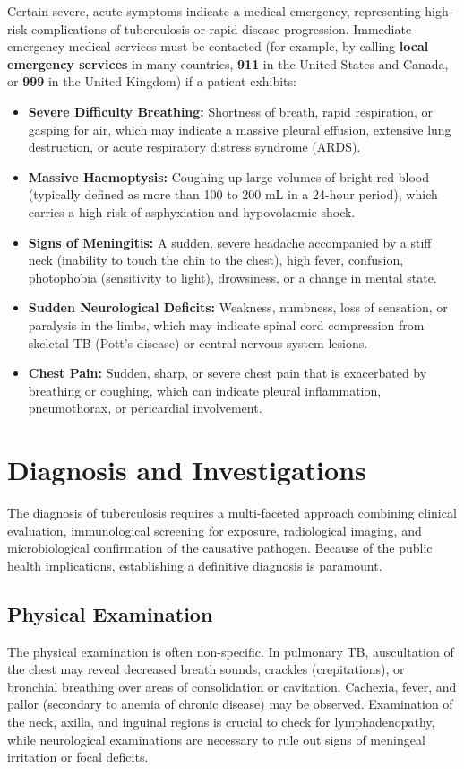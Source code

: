 Certain severe, acute symptoms indicate a medical emergency, representing high-risk complications of tuberculosis or rapid disease progression. Immediate emergency medical services must be contacted (for example, by calling \textbf{local emergency services} in many countries, \textbf{911} in the United States and Canada, or \textbf{999} in the United Kingdom) if a patient exhibits:
\begin{itemize}
    \item \textbf{Severe Difficulty Breathing:} Shortness of breath, rapid respiration, or gasping for air, which may indicate a massive pleural effusion, extensive lung destruction, or acute respiratory distress syndrome (ARDS).
    \item \textbf{Massive Haemoptysis:} Coughing up large volumes of bright red blood (typically defined as more than 100 to 200 mL in a 24-hour period), which carries a high risk of asphyxiation and hypovolaemic shock.
    \item \textbf{Signs of Meningitis:} A sudden, severe headache accompanied by a stiff neck (inability to touch the chin to the chest), high fever, confusion, photophobia (sensitivity to light), drowsiness, or a change in mental state.
    \item \textbf{Sudden Neurological Deficits:} Weakness, numbness, loss of sensation, or paralysis in the limbs, which may indicate spinal cord compression from skeletal TB (Pott's disease) or central nervous system lesions.
    \item \textbf{Chest Pain:} Sudden, sharp, or severe chest pain that is exacerbated by breathing or coughing, which can indicate pleural inflammation, pneumothorax, or pericardial involvement.
\end{itemize}

\section*{Diagnosis and Investigations}
The diagnosis of tuberculosis requires a multi-faceted approach combining clinical evaluation, immunological screening for exposure, radiological imaging, and microbiological confirmation of the causative pathogen. Because of the public health implications, establishing a definitive diagnosis is paramount.

\subsection*{Physical Examination}
The physical examination is often non-specific. In pulmonary TB, auscultation of the chest may reveal decreased breath sounds, crackles (crepitations), or bronchial breathing over areas of consolidation or cavitation. Cachexia, fever, and pallor (secondary to anemia of chronic disease) may be observed. Examination of the neck, axilla, and inguinal regions is crucial to check for lymphadenopathy, while neurological examinations are necessary to rule out signs of meningeal irritation or focal deficits.

